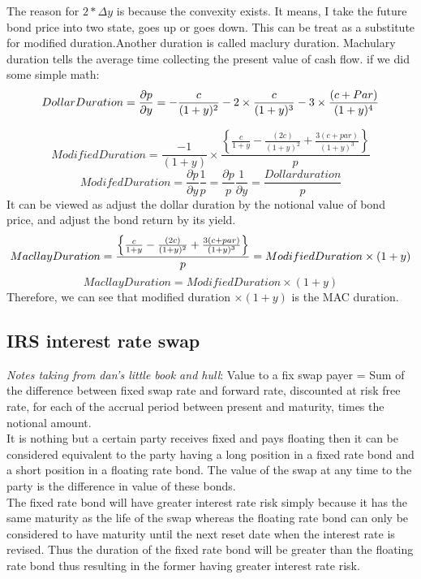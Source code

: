 \documentclass[a4paper,11pt]{article}
\begin{document}
The reason for $2*\Delta y$ is because the convexity exists. It means, I take the future bond price into two state, goes up or goes down. This can be treat as a substitute for modified duration.Another duration is called maclury duration. Machulary duration tells the average time collecting the present value of cash flow. if we did some simple math:
$$ Dollar Duration=\frac{\partial p}{\partial y}= -\frac{c}{(1+y)^2} -2 \times \frac{c}{(1+y)^3}-3\times\frac{(c+Par)}{(1+y)^4}\\
$$

$$
Modified Duration=\frac{-1}{(1+y)}\times \frac{ \left\{\frac{c}{1+y}-\frac{(2c)}{(1+y)^2}+\frac{3(c+par)}{(1+y)^3}\right\}}{p}
$$
$$
Modifed Duration=\frac{\partial p}{\partial y}\frac{1}{p}=\frac{\partial p}{p}\frac{1}{\partial y}=\frac{Dollar duration}{p}
$$
It can be viewed as adjust the dollar duration by the notional value of bond price, and adjust the bond return by its yield.\\
$$ Macllay Duration=\frac{ \left\{\frac{c}{1+y}-\frac{(2c)}{(1+y)^2}+\frac{3(c+par)}{(1+y)^3}\right\}}{p}\\
=Modified Duration \times (1+y)
$$
\begin{equation}
Macllay Duration=Modified Duration \times (1+y)
\end{equation}
Therefore, we can see that modified duration $\times (1+y)$ is the MAC duration.
\subsection{IRS interest rate swap}
{\em Notes taking from dan's little book and hull}: Value to a fix swap payer = Sum of the difference between fixed swap rate and forward rate, discounted at risk free rate, for each of the accrual period between present and maturity, times the notional amount.\\
It is nothing but a certain party receives fixed and pays floating then it can be considered equivalent to the party having a long position in a fixed rate bond and a short position in a floating rate bond. The value of the swap at any time to the party is the difference in value of these bonds.\\
The fixed rate bond will have greater interest rate risk simply because it has the same maturity as the life of the swap whereas the floating rate bond can only be considered to have maturity until the next reset date when the interest rate is revised. Thus the duration of the fixed rate bond will be greater than the floating rate bond thus resulting in the former having greater interest rate risk.\\
\end{document}
